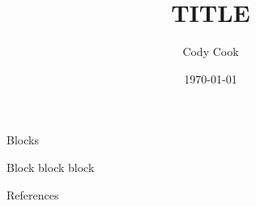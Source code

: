\documentclass[11pt]{mybeamer}
\title{\large TITLE }
\author{Cody Cook}
\date{\today}
\begin{document}
\begin{frame}
    \titlepage
\end{frame}

\begin{frame}{Blocks}
    
    \begin{tboxblue}
        \large Block block block 
        \citet{cook2021gender}
    \end{tboxblue}
\end{frame}


\appendix
\renewcommand{\bibsection}{}
\begin{frame}[allowframebreaks]{References}
  
    
\end{frame}
\end{document}
